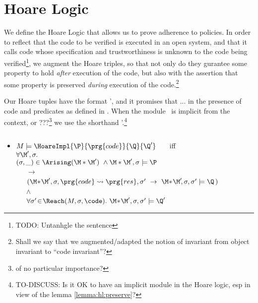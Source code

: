 \section{Hoare Logic}

We define the Hoare Logic that allows us to prove adherence to policies. In order to reflect that the code to be verified is executed in an open system, and that it calls code whose specification and trustworthiness is unknown to the code being verified\footnote{TODO: Untanhgle the sentence}, we augment the Hoare triples, so that not only do they gurantee some property to hold {\em after} execution of the code, but also with the assertion that some property is preserved {\em during} execution of the code.\footnote{Shall we say that we augmented/adapted the notion of invariant from object invariant to ``code invariant''?}
  
Our Hoare tuples have the format \HoareExpl{\P} {} {\M} {\Q}
{\Q'}, and it promises that ... in the presence of code and predicates
as defined in \M. When the module \M\ is implicit from the context, or
???\footnote{of no particular importance?} we use the shorthand
\Hoare{\P} {}  {\Q} {\Q'}.\footnote{TO-DISCUSS: Is it OK to
  have an implicit module \M in the Hoare logic, esp in view of the
  lemma \ref{lemma:hl:preserve}? }



\begin{definition} 
$ $ \\

  \begin{itemize}
  \item
$M  \models \HoareImpl{\P} {\prg{code}} {\Q} {\Q'}  $ \ \ \  iff\\
\SP $\forall \M',\sigma.$\\
\SP $ (\sigma,\_)\in \Arising(\M*\M')\ \wedge \M*\M', \sigma \models \P$\\
\SP \ \ \ $\longrightarrow$ \ \ \ \\
\SP \ \ \  $(\M\!*\!\M', \sigma, \prg{code}  \leadsto \prg{res}, \sigma'   \ \rightarrow  \  \M\!*\!\M'\!, \sigma, \sigma' \models \Q\, )$\\
\SP\ \ \   $\wedge$ \\
\SP\ \ \  $\forall \sigma'\!\in\!\Reach(M,\sigma,\code).\ \M\!*\!\M', \sigma, \sigma' \models \Q'   $

\end{itemize}
\end{definition}




